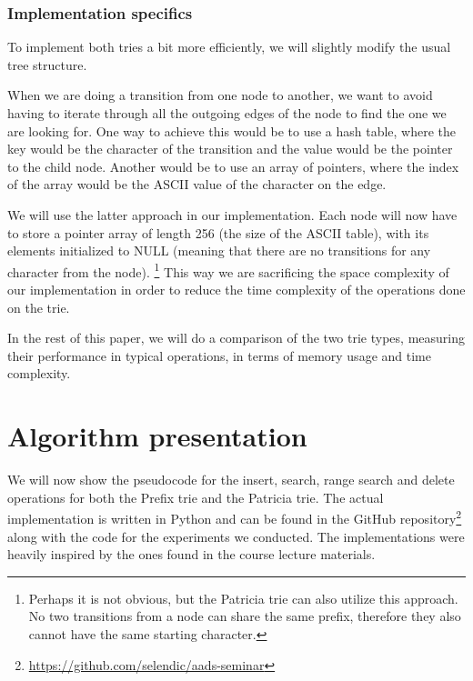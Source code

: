 \documentclass[essay]{fer}
\begin{document}
\subsection{Implementation specifics}
\label{sec:implementation_specifics}

To implement both tries a bit more efficiently, we will slightly modify the usual tree structure.

When we are doing a transition from one node to another, we want to avoid having to iterate through all the outgoing edges of the node to find the one we are looking for.
One way to achieve this would be to use a hash table, where the key would be the character of the transition and the value would be the pointer to the child node.
Another would be to use an array of pointers, where the index of the array would be the ASCII value of the character on the edge.

We will use the latter approach in our implementation. Each node will now have to store a pointer array of length 256 (the size of the ASCII table), with its elements initialized to NULL
(meaning that there are no transitions for any character from the node).
\footnote{Perhaps it is not obvious, but the Patricia trie can also utilize this approach.
No two transitions from a node can share the same prefix, therefore they also cannot have the same starting character.}
This way we are sacrificing the space complexity of our implementation in order to reduce the time complexity of the operations done on the trie.

In the rest of this paper, we will do a comparison of the two trie types, measuring their performance in typical operations, in terms of memory usage and time complexity.


\chapter{Algorithm presentation}
\label{chptr:algorithm_presentation}

We will now show the pseudocode for the insert, search, range search and delete operations for both the Prefix trie and the Patricia trie.
The actual implementation is written in Python and can be found in the GitHub repository\footnote[2]{\href{https://github.com/selendic/aads-seminar}{https://github.com/selendic/aads-seminar}}
along with the code for the experiments we conducted.
The implementations were heavily inspired by the ones found in the course lecture materials\cite{aads_ref}.
\end{document}
